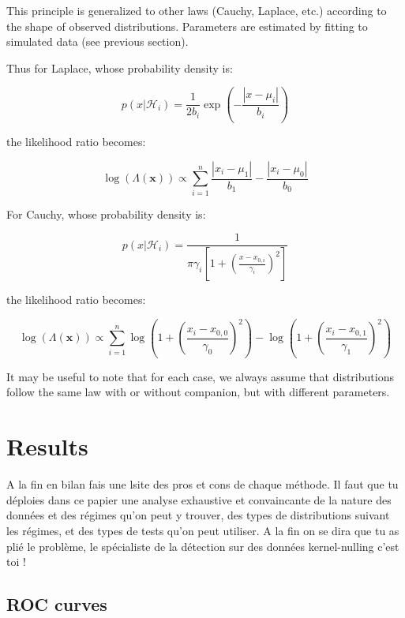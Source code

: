 \documentclass{article}
\newcommand{\dm}[1]{{\color{mulberry} #1}}
\begin{document}
This principle is generalized to other laws (Cauchy, Laplace, etc.) according to the shape of observed distributions. Parameters are estimated by fitting to simulated data (see previous section).

Thus for Laplace, whose probability density is:

\begin{equation}
    p(x|\mathcal{H}_i) = \frac{1}{2b_i} \exp\left(-\frac{|x-\mu_i|}{b_i}\right)
\end{equation}

the likelihood ratio becomes:

\begin{equation}
    \log(\Lambda(\mathbf{x})) \propto \sum_{i=1}^{n} \frac{|x_i - \mu_1|}{b_1} - \frac{|x_i - \mu_0|}{b_0}
\end{equation}

For Cauchy, whose probability density is:

\begin{equation}
    p(x|\mathcal{H}_i) = \frac{1}{\pi \gamma_i \left[1 + \left(\frac{x - x_{0,i}}{\gamma_i}\right)^2\right]}
\end{equation}

the likelihood ratio becomes:

\begin{equation}
    \log(\Lambda(\mathbf{x})) \propto \sum_{i=1}^{n} \log\left(1 + \left(\frac{x_i - x_{0,0}}{\gamma_0}\right)^2\right) - \log\left(1 + \left(\frac{x_i - x_{0,1}}{\gamma_1}\right)^2\right)
\end{equation}

It may be useful to note that for each case, we always assume that distributions follow the same law with or without companion, but with different parameters.

\section{Results}

\dm{A la fin en bilan fais une lsite des pros et cons de chaque méthode. Il faut que tu déploies dans ce papier une analyse exhaustive et convaincante de la nature des données et des régimes qu'on peut y trouver, des types de distributions suivant les régimes, et des types de tests qu'on peut utiliser. A la fin on se dira que tu as plié le problème, le spécialiste de la détection sur des données kernel-nulling c'est toi !  }
\subsection{ROC curves}
\end{document}
